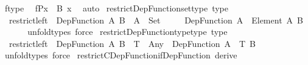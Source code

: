 \begin{isabellebody}
\ f{\isacharunderscore}{\kern0pt}type\ \isamarkupfalse%
\ {\isachardoublequoteopen}f{\isasymrestriction}\isactrlbsub P\isactrlesub {\isacharbackquote}{\kern0pt}x\ {\isacharcolon}{\kern0pt}\ B\ x{\isachardoublequoteclose}\ \isamarkupfalse%
\ auto\isanewline
{}\isamarkupfalse%
%
\endisatagproof
{\isafoldproof}%
%
\isadelimproof
\isanewline
%
\endisadelimproof
\isanewline
{}\isamarkupfalse%
\ restrict{\isacharunderscore}{\kern0pt}Dep{\isacharunderscore}{\kern0pt}Function{\isacharunderscore}{\kern0pt}set{\isacharunderscore}{\kern0pt}type\ {\isacharbrackleft}{\kern0pt}type{\isacharbrackright}{\kern0pt}{\isacharcolon}{\kern0pt}\isanewline
\ \ {\isachardoublequoteopen}restrict{\isacharunderscore}{\kern0pt}left\ {\isacharcolon}{\kern0pt}\ Dep{\isacharunderscore}{\kern0pt}Function\ A\ B\ {\isasymRightarrow}\ {\isacharparenleft}{\kern0pt}A{\isacharprime}{\kern0pt}\ {\isacharcolon}{\kern0pt}\ Set{\isacharparenright}{\kern0pt}\ {\isasymRightarrow}\isanewline
\ \ \ \ Dep{\isacharunderscore}{\kern0pt}Function\ {\isacharparenleft}{\kern0pt}A\ {\isacharampersand}{\kern0pt}\ Element\ A{\isacharprime}{\kern0pt}{\isacharparenright}{\kern0pt}\ B{\isachardoublequoteclose}\isanewline
\ \ \isanewline
%
\isadelimproof
\ \ %
\endisadelimproof
%
\isatagproof
{}\isamarkupfalse%
\ unfold{\isacharunderscore}{\kern0pt}types\ force%
\endisatagproof
{\isafoldproof}%
%
\isadelimproof
\isanewline
%
\endisadelimproof
\isanewline
{}\isamarkupfalse%
\ restrict{\isacharunderscore}{\kern0pt}Dep{\isacharunderscore}{\kern0pt}Function{\isacharunderscore}{\kern0pt}type{\isacharunderscore}{\kern0pt}type\ {\isacharbrackleft}{\kern0pt}type{\isacharbrackright}{\kern0pt}{\isacharcolon}{\kern0pt}\isanewline
\ \ {\isachardoublequoteopen}restrict{\isacharunderscore}{\kern0pt}left\ {\isacharcolon}{\kern0pt}\ Dep{\isacharunderscore}{\kern0pt}Function\ A\ B\ {\isasymRightarrow}\ {\isacharparenleft}{\kern0pt}T\ {\isacharcolon}{\kern0pt}\ Any{\isacharparenright}{\kern0pt}\ {\isasymRightarrow}\ Dep{\isacharunderscore}{\kern0pt}Function\ {\isacharparenleft}{\kern0pt}A\ {\isacharampersand}{\kern0pt}\ T{\isacharparenright}{\kern0pt}\ B{\isachardoublequoteclose}\isanewline
\ \ \isanewline
%
\isadelimproof
\ \ %
\endisadelimproof
%
\isatagproof
{}\isamarkupfalse%
\ unfold{\isacharunderscore}{\kern0pt}types\ force%
\endisatagproof
{\isafoldproof}%
%
\isadelimproof
\isanewline
%
\endisadelimproof
\isanewline
{}\isamarkupfalse%
\ restrict{\isacharunderscore}{\kern0pt}CDep{\isacharunderscore}{\kern0pt}Function{\isacharunderscore}{\kern0pt}if{\isacharunderscore}{\kern0pt}Dep{\isacharunderscore}{\kern0pt}Function\ {\isacharbrackleft}{\kern0pt}derive{\isacharbrackright}{\kern0pt}{\isacharcolon}{\kern0pt}\isanewline

\end{isabellebody}
